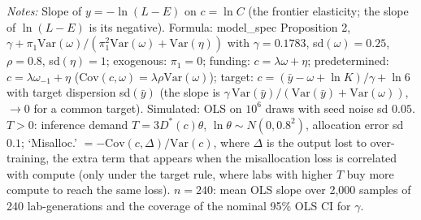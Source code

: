 \begin{table}[!htbp]
\begin{threeparttable}
\begin{tablenotes}[flushleft]
\item \textit{Notes:} Slope of $y=-\ln(L-E)$ on $c=\ln C$ (the frontier elasticity; the slope of $\ln(L-E)$ is its negative). Formula: model\_spec Proposition 2, $\gamma+\pi_1\mathrm{Var}(\omega)/(\pi_1^2\mathrm{Var}(\omega)+\mathrm{Var}(\eta))$ with $\gamma=0.1783$, sd$(\omega)=0.25$, $\rho=0.8$, sd$(\eta)=1$; exogenous: $\pi_1=0$; funding: $c=\lambda\omega+\eta$; predetermined: $c=\lambda\omega_{-1}+\eta$ ($\mathrm{Cov}(c,\omega)=\lambda\rho\mathrm{Var}(\omega)$); target: $c=(\bar y-\omega+\ln K)/\gamma+\ln 6$ with target dispersion sd$(\bar y)$ (the slope is $\gamma\,\mathrm{Var}(\bar y)/(\mathrm{Var}(\bar y)+\mathrm{Var}(\omega))$, $\to0$ for a common target). Simulated: OLS on $10^6$ draws with seed noise sd $0.05$. $T>0$: inference demand $T=3D^*(c)\theta$, $\ln\theta\sim N(0,0.8^2)$, allocation error sd $0.1$; `Misalloc.' $=-\mathrm{Cov}(c,\Delta)/\mathrm{Var}(c)$, where $\Delta$ is the output lost to over-training, the extra term that appears when the misallocation loss is correlated with compute (only under the target rule, where labs with higher $T$ buy more compute to reach the same loss). $n=240$: mean OLS slope over 2{,}000 samples of 240 lab-generations and the coverage of the nominal 95\% OLS CI for $\gamma$.
\end{tablenotes}
\end{threeparttable}
\end{table}
